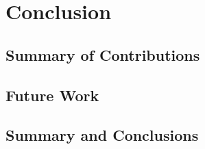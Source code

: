 \chapter{Conclusion}
\label{c:background}


\section{Summary of Contributions}

\section{Future Work}

\section{Summary and Conclusions}